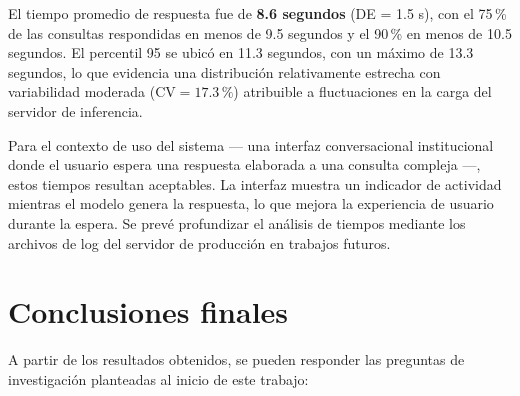 El tiempo promedio de respuesta fue de \textbf{8.6 segundos} (DE = 1.5 s), con el 75\,\% de las consultas respondidas en menos de 9.5 segundos y el 90\,\% en menos de 10.5 segundos. El percentil 95 se ubicó en 11.3 segundos, con un máximo de 13.3 segundos, lo que evidencia una distribución relativamente estrecha con variabilidad moderada ($\text{CV} = 17.3\,\%$) atribuible a fluctuaciones en la carga del servidor de inferencia.

Para el contexto de uso del sistema — una interfaz conversacional institucional donde el usuario espera una respuesta elaborada a una consulta compleja —, estos tiempos resultan aceptables. La interfaz muestra un indicador de actividad mientras el modelo genera la respuesta, lo que mejora la experiencia de usuario durante la espera. Se prevé profundizar el análisis de tiempos mediante los archivos de log del servidor de producción en trabajos futuros.

\section{Conclusiones finales}\label{sec:conclusiones_finales}

A partir de los resultados obtenidos, se pueden responder las preguntas de investigación planteadas al inicio de este trabajo:

